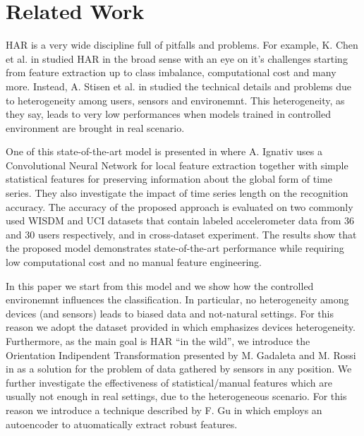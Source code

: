 
\section{Related Work}
\label{sec:related-work}

HAR is a very wide discipline full of pitfalls and problems. For
example, K. Chen et al. in \cite{chen2020deep} studied HAR in the
broad sense with an eye on it's challenges starting from feature
extraction up to class imbalance, computational cost and many
more. Instead, A. Stisen et al. in \cite{stisen2015smart} studied the
technical details and problems due to heterogeneity among users,
sensors and environemnt. This heterogeneity, as they say, leads to
very low performances when models trained in controlled environment
are brought in real scenario.

One of this state-of-the-art model is presented in
\cite{ignatov2018real} where A. Ignativ uses a Convolutional Neural
Network for local feature extraction together with simple statistical
features for preserving information about the global form of time
series. They also investigate the impact of time series length on the
recognition accuracy. The accuracy of the proposed approach is
evaluated on two commonly used WISDM and UCI datasets that contain
labeled accelerometer data from 36 and 30 users respectively, and in
cross-dataset experiment. The results show that the proposed model
demonstrates state-of-the-art performance while requiring low
computational cost and no manual feature engineering.

In this paper we start from this model and we show how the controlled
environemnt influences the classification. In particular, no
heterogeneity among devices (and sensors) leads to biased data and
not-natural settings.  For this reason we adopt the dataset provided
in \cite{stisen2015smart} which emphasizes devices heterogeneity.
Furthermore, as the main goal is HAR ``in the wild'', we introduce the
Orientation Indipendent Transformation presented by M. Gadaleta and
M. Rossi in \cite{gadaleta2018idnet} as a solution for the problem of
data gathered by sensors in any position. We further investigate the
effectiveness of statistical/manual features which are usually not
enough in real settings, due to the heterogeneous scenario. For this
reason we introduce a technique described by F. Gu in
\cite{gu2018locomotion} which employs an autoencoder to atuomatically
extract robust features.
